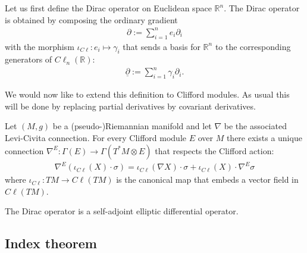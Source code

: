     Let us first define the Dirac operator on Euclidean space $\mathbb{R}^n$. The Dirac operator is obtained by composing the ordinary gradient
    \begin{gather}
        \partial:=\sum_{i=1}^ne_i\partial_i
    \end{gather}
    with the morphism $\iota_{C\ell}:e_i\mapsto\gamma_i$ that sends a basis for $\mathbb{R}^n$ to the corresponding generators of $C\ell_n(\mathbb{R})$:
    \begin{gather}
        \underline{\partial} := \sum_{i=1}^n\gamma_i\partial_i.
    \end{gather}

    We would now like to extend this definition to Clifford modules. As usual this will be done by replacing partial derivatives by covariant derivatives.
    \begin{property}
        Let $(M, g)$ be a (pseudo-)Riemannian manifold and let $\nabla$ be the associated Levi-Civita connection. For every Clifford module $E$ over $M$ there exists a unique connection $\nabla^E:\Gamma(E)\rightarrow \Gamma(T^*M\otimes E)$ that respects the Clifford action:
        \begin{gather}
            \nabla^E(\iota_{C\ell}(X)\cdot\sigma) = \iota_{C\ell}(\nabla X)\cdot\sigma + \iota_{C\ell}(X)\cdot\nabla^E\sigma
        \end{gather}
        where $\iota_{C\ell}:TM\rightarrow C\ell(TM)$ is the canonical map that embeds a vector field in $C\ell(TM)$.
    \end{property}

    \begin{property}
        The Dirac operator is a self-adjoint elliptic differential operator.
    \end{property}

\subsection{Index theorem}

